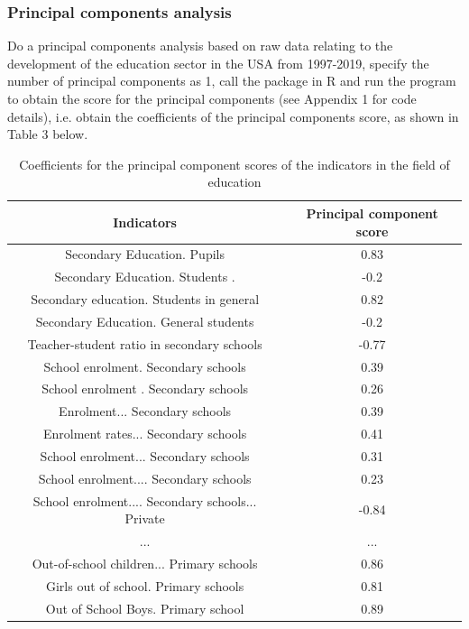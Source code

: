 \documentclass{apmcmthesis}
\begin{document}
\subsubsection{Principal components analysis}
Do a principal components analysis based on raw data relating to the development of the education sector in the USA from 1997-2019, specify the number of principal components as 1, call the package in R and run the program to obtain the score for the principal components (see Appendix 1 for code details), i.e. obtain the coefficients of the principal components score, as shown in Table 3 below.

\begin{table}[H]
	\caption{Coefficients for the principal component scores of the indicators in the field of education}\label{tab:102} \centering
	\begin{tabular}{cc}
		\toprule[1.5pt]
		Indicators & Principal component score \\
				\midrule[1pt]
		Secondary Education. Pupils                                                                                         & 0.83                      \\
		Secondary Education. Students .                                                     & -0.2                      \\
		Secondary education. Students in general& 0.82                      \\
		Secondary Education. General students & -0.2                      \\
		Teacher-student ratio in secondary schools& -0.77                     \\
		School enrolment. Secondary schools & 0.39                      \\
		School enrolment . Secondary schools& 0.26                      \\
		Enrolment... Secondary schools& 0.39                      \\
		Enrolment rates... Secondary schools& 0.41                      \\
		School enrolment... Secondary schools& 0.31                      \\
		School enrolment.... Secondary schools& 0.23                      \\
		School enrolment.... Secondary schools... Private& -0.84                     \\
		...&...\\
		Out-of-school children... Primary schools              & 0.86                      \\
		Girls out of school. Primary schools                                                                                & 0.81                      \\
		Out of School Boys. Primary school                                                                                  & 0.89 \\
		\bottomrule[1.5pt]                    
	\end{tabular}
\end{table}
\end{document}

